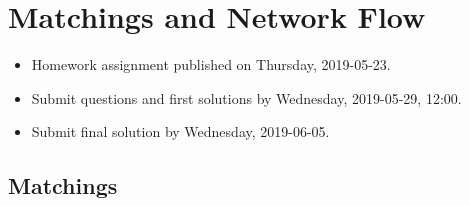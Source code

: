 \documentclass[12pt,a4]{article}
\begin{document}
\maketitle
\newcommand{\val}{\textnormal{val}}


\setcounter{section}{10}

\section{Matchings and Network Flow}



\begin{itemize}
 \item Homework assignment published on Thursday, 2019-05-23.
 \item Submit questions and first solutions by Wednesday, 2019-05-29, 12:00.
 \item Submit final solution by Wednesday, 2019-06-05.
\end{itemize}


\subsection{Matchings}
\end{document}
